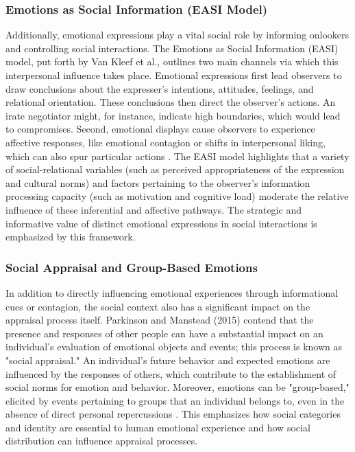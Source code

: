 \documentclass{DESSThesis}
\begin{document}
\subsubsection{Emotions as Social Information (EASI Model)}
Additionally, emotional expressions play a vital social role by informing onlookers and controlling social interactions. The Emotions as Social Information (EASI) model, put forth by Van Kleef et al., outlines two main channels via which this interpersonal influence takes place. Emotional expressions first lead observers to draw conclusions about the expresser's intentions, attitudes, feelings, and relational orientation. These conclusions then direct the observer's actions. An irate negotiator might, for instance, indicate high boundaries, which would lead to compromises. Second, emotional displays cause observers to experience affective responses, like emotional contagion or shifts in interpersonal liking, which can also spur particular actions \cite{van_kleef_how_2009}. The EASI model highlights that a variety of social-relational variables (such as perceived appropriateness of the expression and cultural norms) and factors pertaining to the observer's information processing capacity (such as motivation and cognitive load) moderate the relative influence of these inferential and affective pathways. The strategic and informative value of distinct emotional expressions in social interactions is emphasized by this framework.

\subsubsection{Social Appraisal and Group-Based Emotions}
In addition to directly influencing emotional experiences through informational cues or contagion, the social context also has a significant impact on the appraisal process itself. Parkinson and Manstead (2015) contend that the presence and responses of other people can have a substantial impact on an individual's evaluation of emotional objects and events; this process is known as "social appraisal." An individual's future behavior and expected emotions are influenced by the responses of others, which contribute to the establishment of social norms for emotion and behavior. Moreover, emotions can be "group-based," elicited by events pertaining to groups that an individual belongs to, even in the absence of direct personal repercussions \cite{parkinson_current_2015}. This emphasizes how social categories and identity are essential to human emotional experience and how social distribution can influence appraisal processes.
\end{document}
